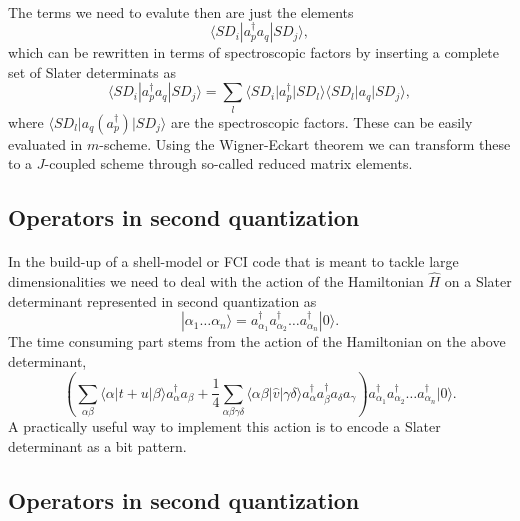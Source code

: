 \paragraph{}
The terms we need to evalute then are just the elements 
\[
\langle SD_i |a_p^{\dagger} a_q | SD_j \rangle, 
\]
which can be rewritten in terms of spectroscopic factors by inserting a complete set of Slater determinats as
\[
\langle SD_i |a_p^{\dagger} a_q | SD_j \rangle = \sum_{l}\langle SD_i \vert a_p^{\dagger}\vert SD_l\rangle \langle SD_l \vert  a_q \vert SD_j \rangle,
\]
where $\langle SD_l\vert a_q(a_p^{\dagger})\vert SD_j\rangle$ are the spectroscopic factors. These can be easily evaluated in $m$-scheme. Using the Wigner-Eckart theorem we can transform these to a $J$-coupled scheme through so-called reduced matrix elements.



\subsection*{Operators in second quantization}

\paragraph{}
In the build-up of a shell-model or FCI code that is meant to tackle large dimensionalities
we need to deal with the action of the Hamiltonian $\hat{H}$ on a
Slater determinant represented in second quantization as
\[
 |\alpha_1\dots \alpha_n\rangle = a_{\alpha_1}^{\dagger} a_{\alpha_2}^{\dagger} \dots a_{\alpha_n}^{\dagger} |0\rangle.
\]
The time consuming part stems from the action of the Hamiltonian
on the above determinant,
\[
\left(\sum_{\alpha\beta} \langle \alpha|t+u|\beta\rangle a_\alpha^{\dagger} a_\beta + \frac{1}{4} \sum_{\alpha\beta\gamma\delta}
                \langle \alpha \beta|\hat{v}|\gamma \delta\rangle a_\alpha^{\dagger} a_\beta^{\dagger} a_\delta a_\gamma\right)a_{\alpha_1}^{\dagger} a_{\alpha_2}^{\dagger} \dots a_{\alpha_n}^{\dagger} |0\rangle.
\]
A practically useful way to implement this action is to encode a Slater determinant as a bit pattern.



\subsection*{Operators in second quantization}

